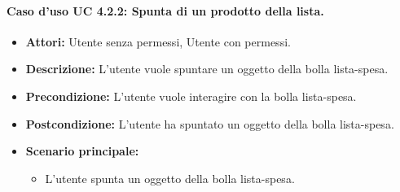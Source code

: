 \paragraph{Caso d'uso UC 4.2.2: Spunta di un prodotto della lista.}
\label{Caso d'uso UC 4.2.2: Spunta di un prodotto della lista.}

\FloatBarrier
\begin{itemize}
\item \textbf{Attori:} Utente senza permessi, Utente con permessi.
\item \textbf{Descrizione:} L'utente vuole spuntare un oggetto della bolla lista-spesa.
\item \textbf{Precondizione:} L'utente vuole interagire con la bolla lista-spesa. 
\item \textbf{Postcondizione:} L'utente ha spuntato un oggetto della bolla lista-spesa.
\item \textbf{Scenario principale:}
	\begin{itemize}
	\item{L'utente spunta un oggetto della bolla lista-spesa.}
	\end{itemize}
\end{itemize}